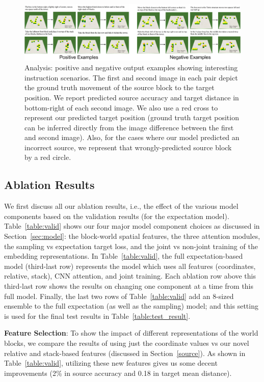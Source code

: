 \documentclass[letterpaper]{article} %
\begin{document}
\begin{figure}[ht!]
\centering
\includegraphics[width=0.99\linewidth]{wide_pdf.pdf}
\caption{Analysis: positive and negative output examples showing interesting instruction scenarios. The first and second image in each pair depict the ground truth movement of the source block to the target position. We report predicted source accuracy and target distance in bottom-right of each second image. We also use a red cross to represent our predicted target position (ground truth target position can be inferred directly from the image difference between the first and second image). Also, for the cases where our model predicted an incorrect source, we represent that wrongly-predicted source block by a red circle.
}
\label{fig:examples}
\end{figure}

\subsection{Ablation Results}
\label{sec:val}
We first discuss all our ablation results, i.e., the effect of the various model components based on the validation results (for the expectation model). Table~\ref{table:valid} shows our four major model component choices as discussed in Section~\ref{sec:model}: the block-world spatial features, the three attention modules, the sampling vs expectation target loss, and the joint vs non-joint training of the embedding representations.  In Table~\ref{table:valid}, the full expectation-based model (third-last row) represents the model which uses all features (coordinates, relative, stack), CNN attention, and joint training. Each ablation row above this third-last row shows the results on changing one component at a time from this full model. Finally, the last two rows of Table~\ref{table:valid} add an 8-sized ensemble to the full expectation (as well as the sampling) model; and this setting is used for the final test results in Table~\ref{table:test_result}.

\textbf{Feature Selection}:
To show the impact of different representations of the world blocks, we compare the results of using just the coordinate values vs our novel relative and stack-based features (discussed in Section~\ref{source}). 
As shown in Table~\ref{table:valid}, utilizing these new features gives us some decent improvements (2\% in source accuracy and 0.18 in target mean distance).
  
\end{document}
